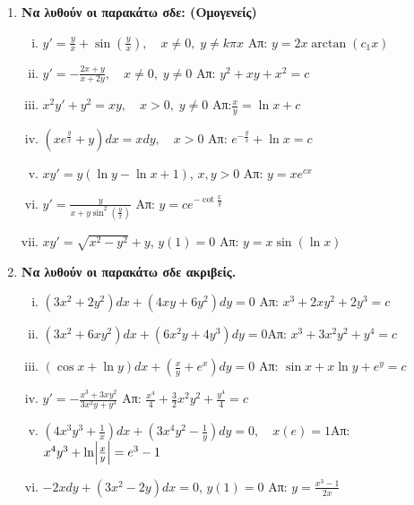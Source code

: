 \begin{enumerate}
  \item {\bfseries Να λυθούν οι παρακάτω σδε: (Ομογενείς)}
    \begin{enumerate}[i)]
      \item $y'=\frac{y}{x}+\sin(\frac{y}{x}), \quad x\neq 0,\; y\neq k\pi x$ 
        \hfill Απ: $y=2x\arctan(c_{1}x)$
      \item $y'=-\frac{2x+y}{x+2y}, \quad x\neq 0,\; y\neq 0$  
        \hfill Απ: $y^{2}+xy+x^{2}=c$
      \item $x^{2}y'+y^{2}=xy, \quad x>0,\; y\neq 0$ \hfill Απ:$\frac{x}{y}=\ln x+c$
      \item $\left(xe^{\frac{y}{x}}+y\right)dx=xdy, \quad x>0$ 
        \hfill Απ: $e^{-\frac{y}{x}}+\ln x =c$
      \item $ xy'=y(\ln{y} - \ln{x} +1) $, $ x,y>0 $ \hfill Απ: $ y=xe^{cx} $ 
      \item $ y' = \frac{y}{x+y \sin^{2}{(\frac{y}{x})}} $ 
        \hfill Απ: $ y=ce^{- \cot{\frac{x}{y} }} $  
      \item $ xy' = \sqrt{ x^{2}-y^{2} } +y $, \quad $ y(1)=0 $ 
        \hfill Απ: $ y = x \sin{(\ln{x})}$  
    \end{enumerate}

  \item {\bfseries Να λυθούν οι παρακάτω σδε ακριβείς.}
    \begin{enumerate}[i)]
      \item $ (3x^{2}+2y^{2})dx+(4xy+6y^{2})dy=0  $ 
        \hfill Απ: $ x^{3}+2xy^{2}+2y^{3}=c $ 
      \item $(3x^2+6xy^2)dx+(6x^2y+4y^3)dy=0$\hfill Απ: $x^3+3x^2y^2+y^4=c$
      \item $ (\cos{x} + \ln{y})dx + \left(\frac{x}{y} + e^{x}\right)dy=0 $ 
        \hfill Απ: $ \sin{x} + x \ln{y} + e^{y}=c $ 
      \item $ y'=- \frac{x^{3}+3xy^{2}}{3x^{2}y+y^{3}} $ 
        \hfill Απ: $ \frac{x^{4}}{4} + \frac{3}{2} x^{2}y^{2} + \frac{y^{4}}{4} = c $ 
      \item $\left(4x^3y^3+\frac{1}{x}\right)dx+\left(3x^4y^2-\frac{1}{y}\right)dy=0, 
        \quad x(e)=1$\hfill Απ: $x^4y^3+\ln \Bigl|\frac{x}{y}\Bigr|=e^3-1$
      \item $ -2xdy + (3x^{2}-2y)dx=0 $, \quad $ y(1)=0 $ 
        \hfill Απ: $ y= \frac{x^{3}-1}{2x} $ 
    \end{enumerate}


\end{enumerate}
